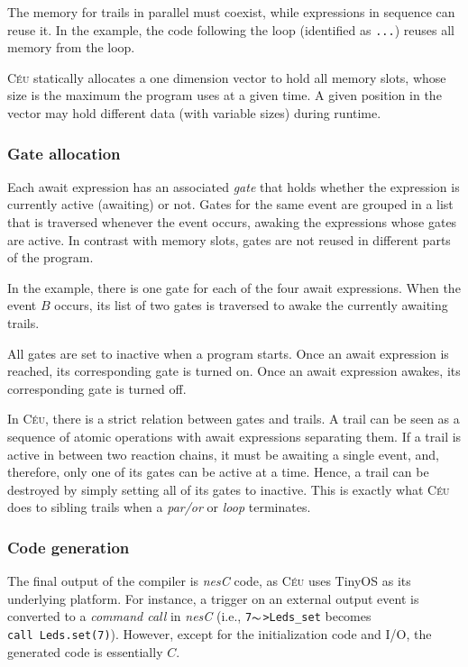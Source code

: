 \documentclass{sig-alternate-ipsn09}
\newcommand{\2}{\;\;}
\newcommand{\5}{\;\;\;\;\;}
\newcommand{\til}{$\thicksim$}
\newcommand{\CEU}{\textsc{C\'{e}u}}
\newcommand{\nesc}{\emph{nesC}}
\newcommand{\code}[1] {{\small{\texttt{#1}}}}
\begin{document}
The memory for trails in parallel must coexist, while expressions in sequence 
can reuse it.
In the example, the code following the loop (identified as \code{...}) reuses 
all memory from the loop.

\CEU{} statically allocates a one dimension vector to hold all memory slots, 
whose size is the maximum the program uses at a given time.
A given position in the vector may hold different data (with variable sizes) 
during runtime.

\subsubsection{Gate allocation}

Each await expression has an associated \emph{gate} that holds whether the 
expression is currently active (awaiting) or not.
Gates for the same event are grouped in a list that is traversed whenever the 
event occurs, awaking the expressions whose gates are active.
In contrast with memory slots, gates are not reused in different parts of the 
program.

In the example, there is one gate for each of the four await expressions.
When the event $B$ occurs, its list of two gates is traversed to awake the 
currently awaiting trails.

All gates are set to inactive when a program starts.
Once an await expression is reached, its corresponding gate is turned on.
Once an await expression awakes, its corresponding gate is turned off.

In \CEU, there is a strict relation between gates and trails.
A trail can be seen as a sequence of atomic operations with await expressions
separating them.
If a trail is active in between two reaction chains, it must be awaiting a 
single event, and, therefore, only one of its gates can be active at a time.
Hence, a trail can be destroyed by simply setting all of its gates to inactive.
This is exactly what \CEU{} does to sibling trails when a \emph{par/or} or 
\emph{loop} terminates.

\subsubsection{Code generation}

The final output of the compiler is \nesc{} code, as \CEU{} uses TinyOS as its 
underlying platform.
For instance, a trigger on an external output event is converted to a 
\emph{command call} in \nesc{} (i.e., \code{7\til>Leds\_set} becomes \code{call~Leds.set(7)}).
However, except for the initialization code and I/O, the generated code is 
essentially $C$.
\end{document}
